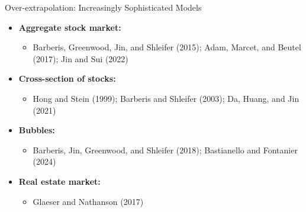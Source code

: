 \documentclass[aspectratio=169, 11pt]{beamer}
\begin{document}
\begin{frame}{Over-extrapolation: Increasingly Sophisticated Models}
\begin{itemize}
\item \textbf{Aggregate stock market:}
  \begin{itemize}
  \item Barberis, Greenwood, Jin, and Shleifer (2015); Adam, Marcet, and Beutel (2017); Jin and Sui (2022)
  \end{itemize}
\item \textbf{Cross-section of stocks:}
  \begin{itemize}
  \item Hong and Stein (1999); Barberis and Shleifer (2003); Da, Huang, and Jin (2021)
  \end{itemize}
\item \textbf{Bubbles:}
  \begin{itemize}
  \item Barberis, Jin, Greenwood, and Shleifer (2018); Bastianello and Fontanier (2024)
  \end{itemize}
\item \textbf{Real estate market:}
  \begin{itemize}
  \item Glaeser and Nathanson (2017)
  \end{itemize}
\end{itemize}
\end{frame}
\end{document}
